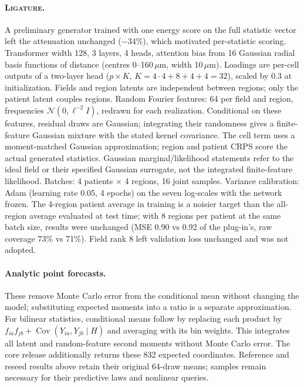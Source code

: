 \documentclass[10pt,letterpaper]{article}
\theoremstyle{definition}
\theoremstyle{remark}
\newcommand{\method}{\textnormal{\textsc{Ligature}}}
\begin{document}
\paragraph{\method{}.} A preliminary generator trained with one energy score on the full statistic vector left the attenuation unchanged ($-34\%$), which motivated per-statistic scoring. Transformer width 128, 3 layers, 4 heads, attention bias from 16 Gaussian radial basis functions of distance (centres 0--160\,$\mu$m, width 10\,$\mu$m). Loadings are per-cell outputs of a two-layer head ($p\times K$, $K=4\cdot4+8+4+4=32$), scaled by 0.3 at initialization. Fields and region latents are independent between regions; only the patient latent couples regions. Random Fourier features: 64 per field and region, frequencies $\mathcal{N}(0,\ell^{-2}I)$, redrawn for each realization. Conditional on these features, residual draws are Gaussian; integrating their randomness gives a finite-feature Gaussian mixture with the stated kernel covariance. The cell term uses a moment-matched Gaussian approximation; region and patient CRPS score the actual generated statistics. Gaussian marginal/likelihood statements refer to the ideal field or their specified Gaussian surrogate, not the integrated finite-feature likelihood. Batches: 4 patients $\times$ 4 regions, 16 joint samples. Variance calibration: Adam (learning rate 0.05, 4 epochs) on the seven log-scales with the network frozen. The 4-region patient average in training is a noisier target than the all-region average evaluated at test time; with 8 regions per patient at the same batch size, results were unchanged (MSE 0.90 vs 0.92 of the plug-in's, raw coverage 73\% vs 71\%). Field rank 8 left validation loss unchanged and was not adopted.
\paragraph{Analytic point forecasts.} These remove Monte Carlo error from the conditional mean without changing the model; substituting expected moments into a ratio is a separate approximation. For bilinear statistics, conditional means follow by replacing each product by $f_{ia}f_{jb}+\operatorname{Cov}(Y_{ia},Y_{jb}\mid H)$ and averaging with its bin weights. This integrates all latent and random-feature second moments without Monte Carlo error. The core release additionally returns these 832 expected coordinates. Reference and reseed results above retain their original 64-draw means; samples remain necessary for their predictive laws and nonlinear queries.
\end{document}

